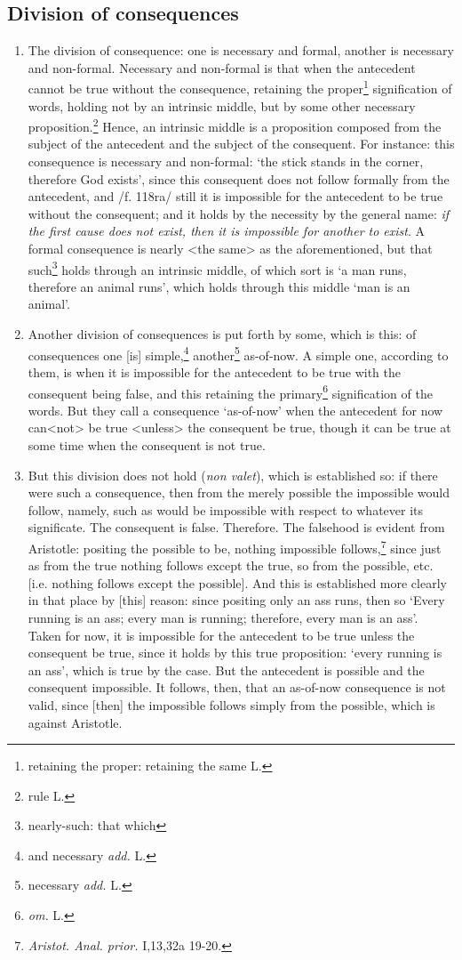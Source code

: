 \documentclass[]{article}
\begin{document}
\subsection{Division of consequences}
\begin{enumerate}
	\item[4.] The division of consequence: one is necessary and formal, another is necessary and non-formal. Necessary and non-formal is that when the antecedent cannot be true without the consequence, retaining the proper\footnote{retaining the proper: retaining the same L.} signification of words, holding not by an intrinsic middle, but by some other necessary proposition.\footnote{rule L.} Hence, an intrinsic middle is a proposition composed from the subject of the antecedent and the subject of the consequent. For instance: this consequence is necessary and non-formal: `the stick stands in the corner, therefore God exists', since this consequent does not follow formally from the antecedent, and /f. 118ra/ still it is impossible for the antecedent to be true without the consequent; and it holds by the necessity by the general name: \textit{if the first cause does not exist, then it is impossible for another to exist}. A formal consequence is nearly <the same> as the aforementioned, but that such\footnote{nearly-such: that which} holds through an intrinsic middle, of which sort is `a man runs, therefore an animal runs', which holds through this middle `man is an animal'. 
	\item[5.] Another division of consequences is put forth by some, which is this: of consequences one [is] simple,\footnote{and necessary \textit{add.} L.} another\footnote{necessary \textit{add.} L.} as-of-now. A simple one, according to them, is when it is impossible for the antecedent to be true with the consequent being false, and this retaining the primary\footnote{\textit{om.} L.} signification of the words. But they call a consequence `as-of-now' when the antecedent for now can<not> be true <unless> the consequent be true, though it can be true at some time when the consequent is not true.
	\item[6.] But this division does not hold (\textit{non valet}), which is established so: if there were such a consequence, then from the merely possible the impossible would follow, namely, such as would be impossible with respect to whatever its significate. The consequent is false. Therefore. The falsehood is evident from Aristotle: positing the possible to be, nothing impossible follows,\footnote{\textit{Aristot. Anal. prior.} I,13,32a 19-20.} since just as from the true nothing follows except the true, so from the possible, etc. [i.e. nothing follows except the possible]. And this is established more clearly in that place by [this] reason: since positing only an ass runs, then so `Every running is an ass; every man is running; therefore, every man is an ass'. Taken for now, it is impossible for the antecedent to be true unless the consequent be true, since it holds by this true proposition: `every running is an ass', which is true by the case. But the antecedent is possible and the consequent impossible. It follows, then, that an as-of-now consequence is not valid, since [then] the impossible follows simply from the possible, which is against Aristotle.

\end{enumerate}
\end{document}
